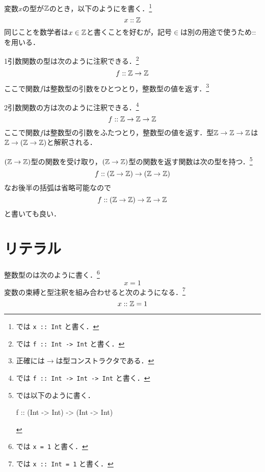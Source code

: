 \documentclass[platex,a5paper,twoside,fleqn,draft]{jsbook}
\newcommand{\keyword}[1]{\textgt{#1}}
\begin{document}
変数$x$の型が$\mathord{\mathbb{Z}}$のとき，以下のように\keyword{型注釈}を書く．\footnote{\haskell では \verb|x :: Int| と書く．}
\begin{equation}
x::\mathord{\mathbb{Z}}
\end{equation}
同じことを数学者は$x\in\mathord{\mathbb{Z}}$と書くことを好むが，記号$\in$は別の用途で使うため$::$を用いる．

1引数関数の型は次のように注釈できる．\footnote{\haskell では \verb|f :: Int -> Int| と書く．}
\begin{equation}
f::\mathord{\mathbb{Z}}\rightarrow\mathord{\mathbb{Z}}
\end{equation}
ここで関数$f$は整数型の引数をひとつとり，整数型の値を返す．\footnote{正確には$\rightarrow$は型コンストラクタである．}

2引数関数の方は次のように注釈できる．\footnote{\haskell では \verb|f :: Int -> Int -> Int| と書く．}
\begin{equation}
f::\mathord{\mathbb{Z}}\rightarrow\mathord{\mathbb{Z}}\rightarrow\mathord{\mathbb{Z}}
\end{equation}
ここで関数$f$は整数型の引数をふたつとり，整数型の値を返す．型$\mathord{\mathbb{Z}}\rightarrow\mathord{\mathbb{Z}}\rightarrow\mathord{\mathbb{Z}}$は$\mathord{\mathbb{Z}}\rightarrow\left(\mathord{\mathbb{Z}}\rightarrow\mathord{\mathbb{Z}}\right)$と解釈される．

$(\mathord{\mathbb{Z}}\rightarrow\mathord{\mathbb{Z}})$型の関数を受け取り，$(\mathord{\mathbb{Z}}\rightarrow\mathord{\mathbb{Z}})$型の関数を返す関数は次の型を持つ．\footnote{\haskell では以下のように書く．
\begin{footcode}
      f :: (Int -> Int) -> (Int -> Int)
\end{footcode}}
\begin{equation}
f::\left(\mathord{\mathbb{Z}}\rightarrow\mathord{\mathbb{Z}}\right)\rightarrow\left(\mathord{\mathbb{Z}}\rightarrow\mathord{\mathbb{Z}}\right)
\end{equation}
なお後半の括弧は省略可能なので
\begin{equation}
f::\left(\mathord{\mathbb{Z}}\rightarrow\mathord{\mathbb{Z}}\right)\rightarrow\mathord{\mathbb{Z}}\rightarrow\mathord{\mathbb{Z}}
\end{equation}
と書いても良い．

\section{リテラル}

整数型の\keyword{リテラル}は次のように書く．\footnote{\haskell では \verb|x = 1| と書く．}
\begin{equation}
x=1
\end{equation}
変数の束縛と型注釈を組み合わせると次のようになる．\footnote{\haskell では \verb|x :: Int = 1| と書く．}
\begin{equation}
x::\mathord{\mathbb{Z}}=1
\end{equation}
\end{document}

